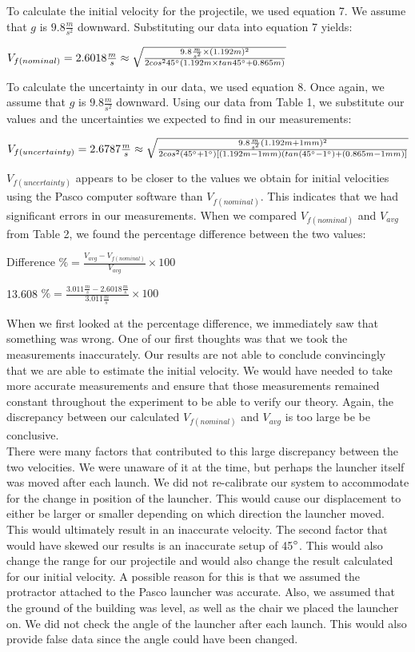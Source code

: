 \documentclass{article}
\begin{document}
To calculate the initial velocity for the projectile, we used equation 7. We assume that $g$ is $9.8\frac{m}{s^2}$ downward. Substituting our data into equation 7 yields:
\begin{center}$V_{f(nominal)} = 2.6018\frac{m}{s}\approx\sqrt{\frac{9.8\frac{m}{s^2}\times(1.192m)^2}{2cos{^2}45\degree(1.192m\times tan45\degree+0.865m)}}$\end{center}

To calculate the uncertainty in our data, we used equation 8. Once again, we assume that $g$ is $9.8\frac{m}{s^2}$ downward. 
Using our data from Table 1, we substitute our values and the uncertainties we expected to find in our measurements:
\begin{center}$V_{f(uncertainty)} = 2.6787\frac{m}{s}\approx\sqrt{\frac{9.8\frac{m}{s^2}(1.192m+1mm)^2}{2cos^2(45\degree+1\degree)[(1.192m-1mm)(tan(45\degree-1\degree)+(0.865m-1mm)]}}$
\end{center}

$V_{f(uncertainty)}$ appears to be closer to the values we obtain for initial velocities using the Pasco computer software than $V_{f(nominal)}$. This indicates that we had significant errors in our measurements. When we compared $V_{f(nominal)}$ and $V_{avg}$ from Table 2, we found the percentage difference between the two values:
\begin{center}Difference $\% = \frac{V_{avg}-V_{f(nominal)}}{V_{avg}}\times 100$\end{center}
\begin{center}13.608 $\% = \frac{3.011\frac{m}{s}-2.6018\frac{m}{s}}{3.011\frac{m}{s}}\times 100$\end{center}
When we first looked at the percentage difference, we immediately saw that something was wrong. One of our first thoughts was that we took the measurements inaccurately. Our results are not able to conclude convincingly that we are able to estimate the initial velocity. We would have needed to take more accurate measurements and ensure that those measurements remained constant throughout the experiment to be able to verify our theory. Again, the discrepancy between our calculated $V_{f(nominal)}$ and $V_{avg}$ is too large be be conclusive.\\\medskip
There were many factors that contributed to this large discrepancy between the two velocities. We were unaware of it at the time, but perhaps the launcher itself was moved after each launch. We did not re-calibrate our system to accommodate for the change in position of the launcher. This would cause our displacement to either be larger or smaller depending on which direction the launcher moved. This would ultimately result in an inaccurate velocity. The second factor that would have skewed our results is an inaccurate setup of 45$\degree$. This would also change the range for our projectile and would also change the result calculated for our initial velocity. A possible reason for this is that we assumed the protractor attached to the Pasco launcher was accurate. Also, we assumed that the ground of the building was level, as well as the chair we placed the launcher on. We did not check the angle of the launcher after each launch. This would also provide false data since the angle could have been changed.
\end{document}
